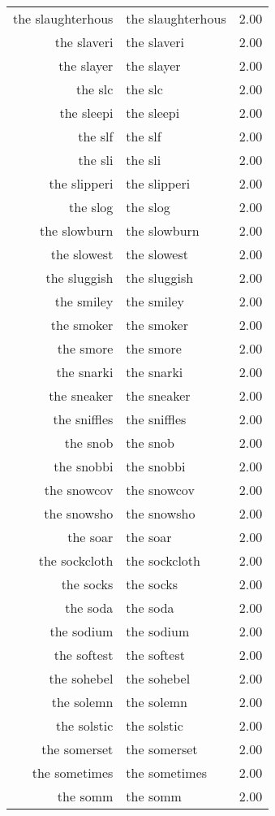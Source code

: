 \begin{table}[ht]
\begin{tabular}{rlr}
  the slaughterhous & the slaughterhous & 2.00 \\ 
  the slaveri & the slaveri & 2.00 \\ 
  the slayer & the slayer & 2.00 \\ 
  the slc & the slc & 2.00 \\ 
  the sleepi & the sleepi & 2.00 \\ 
  the slf & the slf & 2.00 \\ 
  the sli & the sli & 2.00 \\ 
  the slipperi & the slipperi & 2.00 \\ 
  the slog & the slog & 2.00 \\ 
  the slowburn & the slowburn & 2.00 \\ 
  the slowest & the slowest & 2.00 \\ 
  the sluggish & the sluggish & 2.00 \\ 
  the smiley & the smiley & 2.00 \\ 
  the smoker & the smoker & 2.00 \\ 
  the smore & the smore & 2.00 \\ 
  the snarki & the snarki & 2.00 \\ 
  the sneaker & the sneaker & 2.00 \\ 
  the sniffles & the sniffles & 2.00 \\ 
  the snob & the snob & 2.00 \\ 
  the snobbi & the snobbi & 2.00 \\ 
  the snowcov & the snowcov & 2.00 \\ 
  the snowsho & the snowsho & 2.00 \\ 
  the soar & the soar & 2.00 \\ 
  the sockcloth & the sockcloth & 2.00 \\ 
  the socks & the socks & 2.00 \\ 
  the soda & the soda & 2.00 \\ 
  the sodium & the sodium & 2.00 \\ 
  the softest & the softest & 2.00 \\ 
  the sohebel & the sohebel & 2.00 \\ 
  the solemn & the solemn & 2.00 \\ 
  the solstic & the solstic & 2.00 \\ 
  the somerset & the somerset & 2.00 \\ 
  the sometimes & the sometimes & 2.00 \\ 
  the somm & the somm & 2.00 \\ 

\end{tabular}
\end{table}
